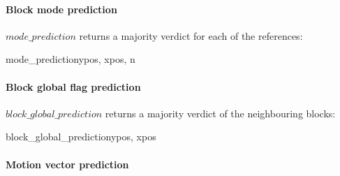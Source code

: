 \paragraph{Block mode prediction \\}
\label{modeprediction}

$mode\_prediction$ returns a majority verdict for each of the references:

\begin{pseudo}{mode\_prediction}{ypos, xpos, n}
    \bsRET{\false}
    \bsRET{\BlockData[ypos][xpos-1][mode][n]}
    \bsRET{\BlockData[ypos-1][xpos][mode][n]}
\bsEND
{}

\end{pseudo}

\paragraph{Block global flag prediction \\}
\label{blockglobalprediction}

$block\_global\_prediction$ returns a majority verdict of the neighbouring blocks:

\begin{pseudo}{block\_global\_prediction}{ypos, xpos}
    \bsRET{\false}
    \bsRET{\BlockData[ypos][xpos-1][global]}
    \bsRET{\BlockData[ypos-1][xpos][global]}
\bsEND


\end{pseudo}

\paragraph{Motion vector prediction \\}
\label{mvprediction}

